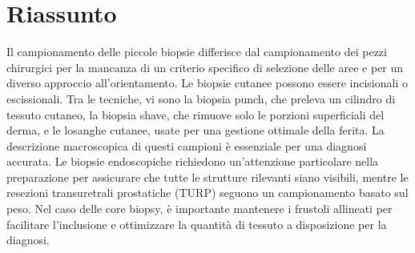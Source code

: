 \section{Riassunto}

Il campionamento delle piccole biopsie differisce dal campionamento dei pezzi chirurgici per la mancanza di un criterio specifico di selezione delle aree e per un diverso approccio all'orientamento.  Le biopsie cutanee possono essere incisionali o escissionali. Tra le tecniche, vi sono la biopsia punch, che preleva un cilindro di tessuto cutaneo, la biopsia shave, che rimuove solo le porzioni superficiali del derma, e le losanghe cutanee, usate per una gestione ottimale della ferita. La descrizione macroscopica di questi campioni è essenziale per una diagnosi accurata. Le biopsie endoscopiche richiedono un'attenzione particolare nella preparazione per assicurare che tutte le strutture rilevanti siano visibili, mentre le resezioni transuretrali prostatiche (TURP) seguono un campionamento basato sul peso. Nel caso delle core biopsy, è importante mantenere i frustoli allineati per facilitare l'inclusione e ottimizzare la quantità di tessuto a disposizione per la diagnosi.

